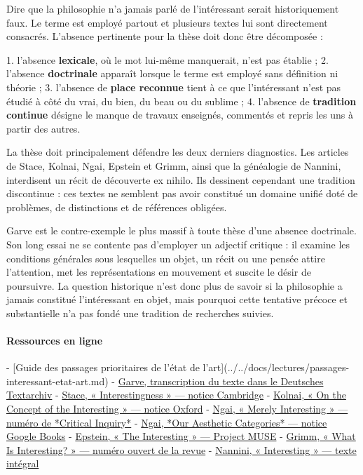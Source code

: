 \documentclass[10pt,a4paper]{article}
\begin{document}
Dire que la philosophie n'a jamais parlé de l'intéressant serait historiquement faux. Le terme est employé partout et plusieurs textes lui sont directement consacrés. L'absence pertinente pour la thèse doit donc être décomposée :

1. l'absence \textbf{lexicale}, où le mot lui-même manquerait, n'est pas établie ; 2. l'absence \textbf{doctrinale} apparaît lorsque le terme est employé sans définition    ni théorie ; 3. l'absence de \textbf{place reconnue} tient à ce que l'intéressant n'est pas étudié    à côté du vrai, du bien, du beau ou du sublime ; 4. l'absence de \textbf{tradition continue} désigne le manque de travaux enseignés,    commentés et repris les uns à partir des autres.

La thèse doit principalement défendre les deux derniers diagnostics. Les articles de Stace, Kolnai, Ngai, Epstein et Grimm, ainsi que la généalogie de Nannini, interdisent un récit de découverte ex nihilo. Ils dessinent cependant une tradition discontinue : ces textes ne semblent pas avoir constitué un domaine unifié doté de problèmes, de distinctions et de références obligées.

Garve est le contre-exemple le plus massif à toute thèse d'une absence doctrinale. Son long essai ne se contente pas d'employer un adjectif critique : il examine les conditions générales sous lesquelles un objet, un récit ou une pensée attire l'attention, met les représentations en mouvement et suscite le désir de poursuivre. La question historique n'est donc plus de savoir si la philosophie a jamais constitué l'intéressant en objet, mais pourquoi cette tentative précoce et substantielle n'a pas fondé une tradition de recherches suivies.

\paragraph{Ressources en ligne}
- [Guide des passages prioritaires de l'état de l'art](../../docs/lectures/passages-interessant-etat-art.md) - \href{\detokenize{https://www.deutschestextarchiv.de/book/show/garve_sammlung_1779}}{Garve, transcription du texte dans le Deutsches Textarchiv} - \href{\detokenize{https://www.cambridge.org/core/journals/philosophy/article/abs/interestingness/EEF830F5A3202674EB10D1B6452386E5}}{Stace, « Interestingness » — notice Cambridge} - \href{\detokenize{https://academic.oup.com/bjaesthetics/article/4/1/22/16793}}{Kolnai, « On the Concept of the Interesting » — notice Oxford} - \href{\detokenize{https://criticalinquiry.uchicago.edu/past_issues/issue/summer_2008_v34_n4/}}{Ngai, « Merely Interesting » — numéro de *Critical Inquiry*} - \href{\detokenize{https://books.google.com/books?id=Lyz3ugAACAAJ}}{Ngai, *Our Aesthetic Categories* — notice Google Books} - \href{\detokenize{https://muse.jhu.edu/article/364012}}{Epstein, « The Interesting » — Project MUSE} - \href{\detokenize{https://logos-and-episteme.acadiasi.ro/volume-ii-issue-4-december-2011/}}{Grimm, « What Is Interesting? » — numéro ouvert de la revue} - \href{\detokenize{https://lexicon.mimesisjournals.com/archive/2018/autumn/Interesting.pdf}}{Nannini, « Interesting » — texte intégral}
\end{document}
